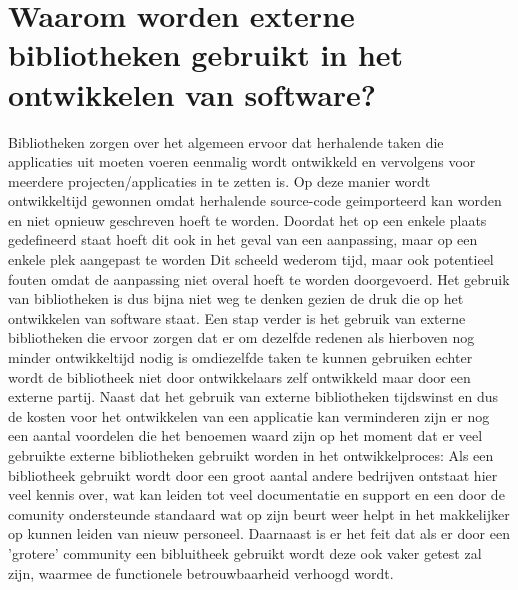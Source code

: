 \section{Waarom worden externe bibliotheken gebruikt in het ontwikkelen van software?}\label{sec:waarom-worden-externe-bibliotheken-gebruikt-in-het-ontwikkelen-van-software?}
Bibliotheken zorgen over het algemeen ervoor dat herhalende taken die applicaties uit moeten voeren eenmalig wordt ontwikkeld en vervolgens voor meerdere projecten/applicaties in te zetten is. Op deze manier wordt ontwikkeltijd gewonnen omdat herhalende source-code geimporteerd kan worden en niet opnieuw geschreven hoeft te worden. Doordat het op een enkele plaats gedefineerd staat hoeft dit ook in het geval van een aanpassing, maar op een enkele plek aangepast te worden Dit scheeld wederom tijd, maar ook potentieel fouten omdat de aanpassing niet overal hoeft te worden doorgevoerd. Het gebruik van bibliotheken is dus bijna niet weg te denken gezien de druk die op het ontwikkelen van software staat. Een stap verder is het gebruik van externe bibliotheken die ervoor zorgen dat er om dezelfde redenen als hierboven nog minder ontwikkeltijd nodig is omdiezelfde taken te kunnen gebruiken echter wordt de bibliotheek niet door ontwikkelaars zelf ontwikkeld maar door een externe partij. Naast dat het gebruik van externe bibliotheken tijdswinst en dus de kosten voor het ontwikkelen van een applicatie kan verminderen zijn er nog een aantal voordelen die het benoemen waard zijn op het moment dat er veel gebruikte externe bibliotheken gebruikt worden in het ontwikkelproces: Als een bibliotheek gebruikt wordt door een groot aantal andere bedrijven ontstaat hier veel kennis over, wat kan leiden tot veel documentatie en support en een door de comunity ondersteunde standaard wat op zijn beurt weer helpt in het makkelijker op kunnen leiden van nieuw personeel. Daarnaast is er het feit dat als er door een 'grotere' community een bibluitheek gebruikt wordt deze ook vaker getest zal zijn, waarmee de functionele betrouwbaarheid verhoogd wordt.

